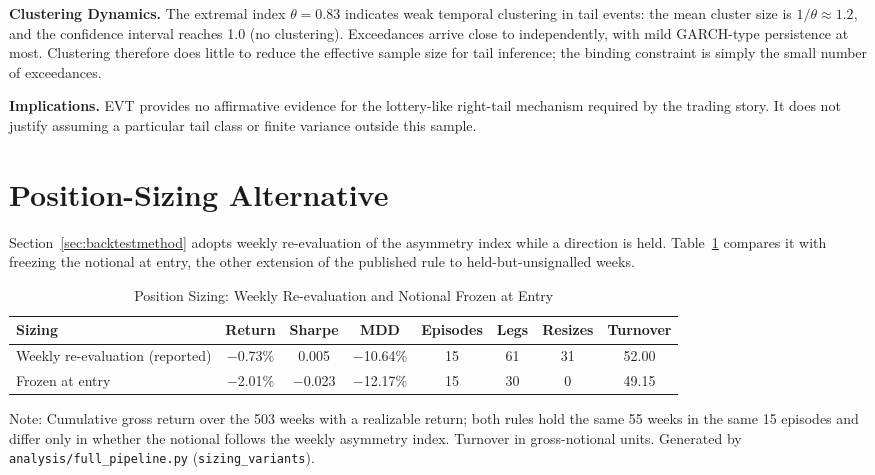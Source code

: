 \documentclass[11pt]{article}
\begin{document}
\textbf{Clustering Dynamics.} The extremal index $\theta = 0.83$ indicates weak temporal clustering in tail events: the mean cluster size is $1/\theta \approx 1.2$, and the confidence interval reaches 1.0 (no clustering). Exceedances arrive close to independently, with mild GARCH-type persistence \citep{bollerslev1986generalized} at most. Clustering therefore does little to reduce the effective sample size for tail inference; the binding constraint is simply the small number of exceedances.

\textbf{Implications.} EVT provides no affirmative evidence for the lottery-like right-tail mechanism required by the trading story. It does not justify assuming a particular tail class or finite variance outside this sample.

\section{Position-Sizing Alternative}
\label{appendix:sizing}

Section~\ref{sec:backtestmethod} adopts weekly re-evaluation of the asymmetry index while a direction is held. Table~\ref{tab:sizing} compares it with freezing the notional at entry, the other extension of the published rule to held-but-unsignalled weeks.

\begin{table}[H]
\centering
\caption{Position Sizing: Weekly Re-evaluation and Notional Frozen at Entry}
\label{tab:sizing}
\small
\begin{tabular}{@{}lccccccc@{}}
\toprule
Sizing & Return & Sharpe & MDD & Episodes & Legs & Resizes & Turnover \\
\midrule
Weekly re-evaluation (reported) & $-$0.73\% & 0.005 & $-$10.64\% & 15 & 61 & 31 & 52.00 \\
Frozen at entry & $-$2.01\% & $-$0.023 & $-$12.17\% & 15 & 30 & 0 & 49.15 \\
\bottomrule
\end{tabular}
\par\vspace{0.3em}
\parbox{\linewidth}{\footnotesize Note: Cumulative gross return over the 503 weeks with a realizable return; both rules hold the same 55 weeks in the same 15 episodes and differ only in whether the notional follows the weekly asymmetry index. Turnover in gross-notional units. Generated by \texttt{analysis/full\_pipeline.py} (\texttt{sizing\_variants}).}
\end{table}
\end{document}
